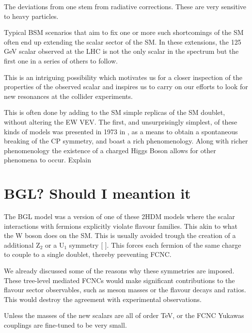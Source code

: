 The deviations from one stem from radiative corrections. These are very sensitive to heavy particles. 



Typical BSM scenarios that aim to fix one or more such shortcomings of the SM often end up extending the scalar
sector of the SM. In these extensions, the 125 GeV scalar observed at the LHC is not the only scalar in the spectrum but the first one in a series of others to follow.

This is an intriguing possibility which motivates us
for a closer inspection of the properties of the observed scalar and inspires us to carry on our efforts to look for
new resonances at the collider experiments.

This is often done by adding to the SM simple replicas of the SM doublet, without altering the EW VEV. The first, and unsurprisingly simplest, of these kinds of models was presented in 1973 in \cite{lee1973theory}, as a means to obtain a spontaneous breaking of the CP symmetry, and boast a rich phenomenology. Along with richer phenomenology the existence of a charged Higgs Boson allows for other phenomena to occur. {\color{red} Explain} 

\section{BGL? Should I meantion it}

The BGL model was a version of one of these 2HDM models where the scalar interactions with fermions explicitly violate flavour families. This akin to what the W boson does on the SM. This is usually avoided trough the creation of a additional $\mathrm{Z}_2$  or a $\mathrm{U}_1$ symmetry [
]. This forces each fermion of the same charge to couple to a single doublet, thereby preventing FCNC.

We already discussed some of the reasons why these symmetries are imposed. These tree-level mediated FCNCs would make significant contributions to the flavour sector observables, such as meson masses or the flavour decays and ratios. This would destroy the agreement with experimental observations. 

Unless the masses of the new scalars are all of order TeV, or the FCNC Yukawas couplings are fine-tuned to be very small. 

